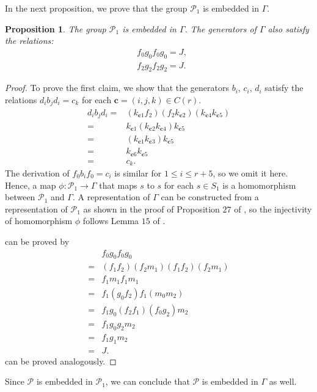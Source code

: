 \documentclass[11pt,letterpaper]{article}
\newcommand{\1}{\mathbb{1}}
\newcommand{\Pg}{\mathcal{P}}
\newcommand{\bc}{\pmb{c}}
\newtheorem{proposition}[theorem]{Proposition}
\theoremstyle{definition}
\begin{document}
In the next proposition, we prove that the group $\Pg_1$ is embedded in $\Gamma$.
\begin{proposition}
    \label{prop:g1gamma}
	The group $\Pg_1$ is embedded in $\Gamma$.
	The generators of $\Gamma$ also satisfy the relations: 
	\begin{align}
	    \label{eq:mg1} &f_0 g_0 f_0 g_0 = J,\\
	    \label{eq:mg2} &f_2 g_2 f_2 g_2 = J.
	\end{align}
\end{proposition}
\begin{proof}
    To prove the first claim, we show that the generators
    $b_i$, $c_i$, $d_i$ satisfy the relations
    $d_ib_jd_i = c_k$ for each $\bc = (i,j,k) \in C(r)$.
    \begin{align*}
        d_ib_jd_i =& (k_{\bc 1} f_2)(f_2 k_{\bc 2})(k_{\bc 4} k_{\bc 5})\\ 
        =& k_{\bc 1}(k_{\bc 2}k_{\bc 4})k_{\bc 5} \\
        =& (k_{\bc 1} k_{\bc 3}) k_{\bc 5} \\
        =& k_{\bc 6} k_{\bc 5} \\
        =& c_k.
    \end{align*}
    The derivation of $f_0 b_i f_0 = c_i$ is similar for $1 \leq i \leq r+5$, so we omit it here.
    Hence, a map $\phi:\Pg_1 \rightarrow \Gamma$ that maps $s$
    to $s$ for each $s \in S_1$ is a homomorphism between $\Pg_1$ and 
    $\Gamma$. 
    A representation of $\Gamma$ can be constructed from a representation 
    of $\Pg_1$ as shown in the proof of Proposition $27$ of \cite{slofstra2017},
    so the injectivity of homomorphism $\phi$ follows Lemma $15$ of \cite{slofstra2017}.
    
     can be proved by
    \begin{align*}
        &f_0 g_0 f_0 g_0 \\
        = &(f_1 f_2) (f_2 m_1)  (f_1 f_2) (f_2 m_1)\\
        = &f_1 m_1 f_1 m_1 \\
        = &f_1 (g_0 f_2) f_1 (m_0 m_2) \\
        = &f_1 g_0 (f_2 f_1) (f_0 g_2) m_2 \\
        = &f_1 g_0 g_2 m_2 \\
        = &f_1 g_1 m_2 \\
        = &J.
    \end{align*}
     can be proved analogously.
\end{proof}
Since $\Pg$ is embedded in $\Pg_1$, we can conclude that
$\Pg$ is embedded in $\Gamma$ as well.
\end{document}
